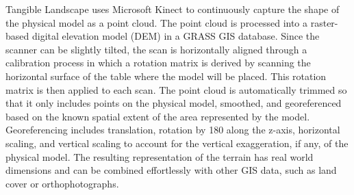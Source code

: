 \documentclass[prodmode,acmtochi]{acmsmall} %
\begin{document}



Tangible Landscape uses Microsoft Kinect
to continuously capture the shape of the physical model
as a point cloud.
The point cloud is processed into a 
raster-based digital elevation model (DEM) 
in a GRASS GIS database.
Since the scanner can be slightly tilted,
the scan is horizontally aligned
through a calibration process in which
a rotation matrix is derived 
by scanning the horizontal surface 
of the table where the model will be placed.
This rotation matrix is then applied to each scan.
The point cloud is automatically trimmed 
so that it only includes points on the physical model,
smoothed, and georeferenced based on the known
spatial extent of the area represented by the model.
Georeferencing includes translation, 
rotation by 180\textdegree{} along the z-axis,
horizontal scaling, and vertical scaling
to account for the vertical exaggeration, if any,
 of the physical model.
The resulting representation of the terrain 
has real world dimensions
and can be combined effortlessly with other GIS data, 
such as land cover or orthophotographs.
\end{document}
